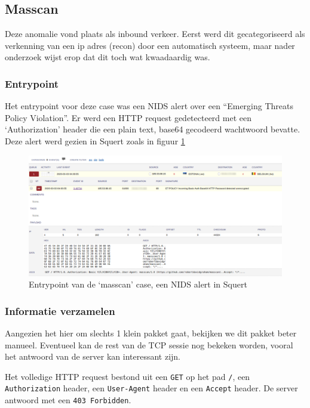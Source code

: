 \documentclass[a4paper,12pt]{report}
\begin{document}
\subsection{Masscan}
Deze anomalie vond plaats als inbound verkeer.
Eerst werd dit gecategoriseerd als verkenning van een ip adres (recon) door een automatisch systeem, maar nader onderzoek wijst erop dat dit toch wat kwaadaardig was.

\subsubsection{Entrypoint}
Het entrypoint voor deze case was een NIDS alert over een ``Emerging Threats Policy Violation''.
Er werd een HTTP request gedetecteerd met een `Authorization' header die een plain text, base64 gecodeerd wachtwoord bevatte.
Deze alert werd gezien in Squert zoals in figuur \ref{fig:analyse-masscan-entrypoint}

\begin{figure}[H]
  \centering
  \includegraphics[width=\textwidth]{analyse-masscan-entrypoint}
  \caption{Entrypoint van de `masscan' case, een NIDS alert in Squert}
  \label{fig:analyse-masscan-entrypoint}
\end{figure}


\subsubsection{Informatie verzamelen}
Aangezien het hier om slechts 1 klein pakket gaat, bekijken we dit pakket beter manueel.
Eventueel kan de rest van de TCP sessie nog bekeken worden, vooral het antwoord van de server kan interessant zijn.

Het volledige HTTP request bestond uit een \lstinline|GET| op het pad \lstinline|/|, een \lstinline|Authorization| header, een \lstinline|User-Agent| header en een \lstinline|Accept| header.
De server antwoord met een \lstinline|403 Forbidden|.
\end{document}
